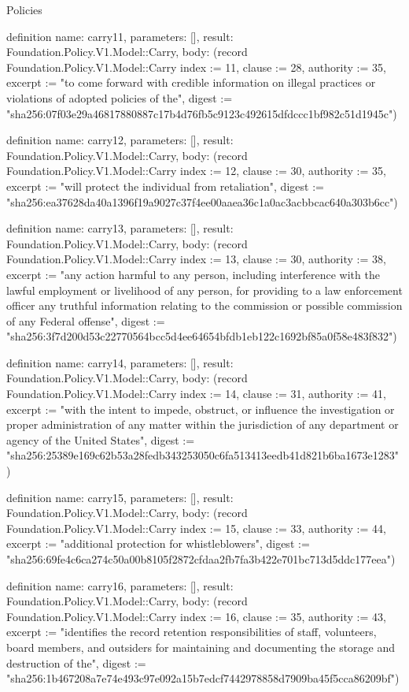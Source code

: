 \begin{lexlean}{Policies}
\begin{semanticmodule}
definition{
  name: carry11,
  parameters: [],
  result: Foundation.Policy.V1.Model::Carry,
  body: (record Foundation.Policy.V1.Model::Carry {index := 11, clause := 28, authority := 35, excerpt := "to come forward with credible information on illegal practices or violations of adopted policies of the", digest := "sha256:07f03e29a46817880887c17b4d76fb5c9123c492615dfdccc1bf982c51d1945c"})
}

definition{
  name: carry12,
  parameters: [],
  result: Foundation.Policy.V1.Model::Carry,
  body: (record Foundation.Policy.V1.Model::Carry {index := 12, clause := 30, authority := 35, excerpt := "will protect the individual from retaliation", digest := "sha256:ea37628da40a1396f19a9027c37f4ee00aaea36c1a0ac3acbbcac640a303b6cc"})
}

definition{
  name: carry13,
  parameters: [],
  result: Foundation.Policy.V1.Model::Carry,
  body: (record Foundation.Policy.V1.Model::Carry {index := 13, clause := 30, authority := 38, excerpt := "any action harmful to any person, including interference with the lawful employment or livelihood of any person, for providing to a law enforcement officer any truthful information relating to the commission or possible commission of any Federal offense", digest := "sha256:3f7d200d53c22770564bcc5d4ee64654bfdb1eb122c1692bf85a0f58e483f832"})
}

definition{
  name: carry14,
  parameters: [],
  result: Foundation.Policy.V1.Model::Carry,
  body: (record Foundation.Policy.V1.Model::Carry {index := 14, clause := 31, authority := 41, excerpt := "with the intent to impede, obstruct, or influence the investigation or proper administration of any matter within the jurisdiction of any department or agency of the United States", digest := "sha256:25389e169c62b53a28fedb343253050c6fa513413eedb41d821b6ba1673e1283"})
}

definition{
  name: carry15,
  parameters: [],
  result: Foundation.Policy.V1.Model::Carry,
  body: (record Foundation.Policy.V1.Model::Carry {index := 15, clause := 33, authority := 44, excerpt := "additional protection for whistleblowers", digest := "sha256:69fe4c6ca274c50a00b8105f2872cfdaa2fb7fa3b422e701bc713d5ddc177eea"})
}

definition{
  name: carry16,
  parameters: [],
  result: Foundation.Policy.V1.Model::Carry,
  body: (record Foundation.Policy.V1.Model::Carry {index := 16, clause := 35, authority := 43, excerpt := "identifies the record retention responsibilities of staff, volunteers, board members, and outsiders for maintaining and documenting the storage and destruction of the", digest := "sha256:1b467208a7e74e493c97e092a15b7edcf7442978858d7909ba45f5cca86209bf"})
}


\end{semanticmodule}
\end{lexlean}
